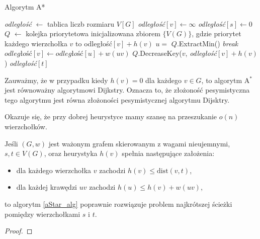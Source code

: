 \begin{algorithm}[H]
	\caption{Algorytm A*}
	\begin{algorithmic}[1]
		\State \textit{odległość} $\gets$ tablica liczb rozmiaru $V[G]$
		\State \textit{odległość}$[v]\gets\infty$
		\EndFor
		\State \textit{odległość}$[s]\gets 0$
		\State $Q$ $\gets$ kolejka priorytetowa inicjalizowana 
		zbiorem $\{V(G)\}$, gdzie priorytet każdego wierzchołka $v$
		to odległość$[v] + h(v)$
		\State $u =$ $Q$.ExtractMin()
		\State \textit{break}
		\EndIf
		\State $\textit{odległość}[v] \gets \textit{odległość}[u] + w(uv)$
		\State $Q$.DecreaseKey($v$, \textit{odległość}$[v] + h(v)$)
		\EndIf
		\EndFor
		\EndWhile
		\State \Return \textit{odległość}$[t]$
		\EndProcedure
	\end{algorithmic}
	\label{aStar_alg}
\end{algorithm}

Zauważmy, że w przypadku kiedy $h(v) = 0$ dla każdego $v \in G$, 
to algorytm A$^*$ jest równoważny algorytmowi Dijkstry. Oznacza to, że
złożoność pesymistyczna tego algorytmu jest równa złożoności
pesymistycznej algorytmu Dijsktry.

Okazuje się, że przy dobrej heurystyce mamy szansę na 
przeszukanie $o(n)$ wierzchołków. %

\begin{theorem}
	 Jeśli
	$(G, w)$ jest ważonym grafem skierowanym
	z wagami nieujemnymi,
	$s,t \in V(G)$, oraz heurystyka $h(v)$
	spełnia następujące założenia:
	\begin{itemize}
		\item dla każdego wierzchołka $v$ zachodzi $h(v) \leq \text{dist}(v, t)$,
		\item dla każdej krawędzi $uv$ zachodzi $h(u) \leq h(v) + w(uv)$,
	\end{itemize}
	to algorytm \ref{aStar_alg}
	poprawnie rozwiązuje problem najkrótszej ścieżki
	pomiędzy wierzchołkami $s$ i $t$.
	\begin{proof}
	\end{proof}
	\label{aStar_proof}
\end{theorem}

